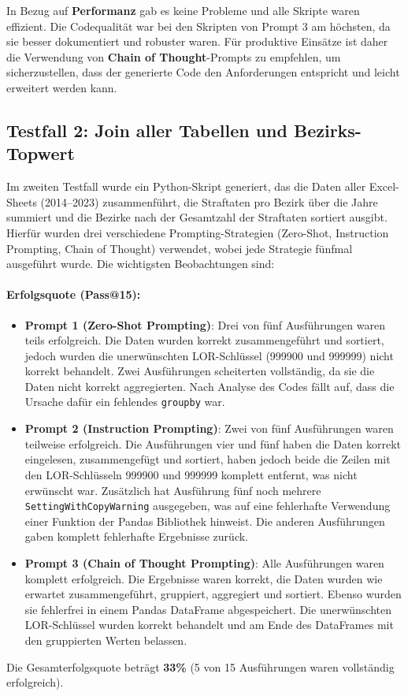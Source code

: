 \documentclass[11pt,a4paper]{article}
\begin{document}
In Bezug auf \textbf{Performanz} gab es keine Probleme und alle Skripte waren effizient. Die Codequalität war bei den Skripten von Prompt 3 am höchsten, da sie besser dokumentiert und robuster waren. Für produktive Einsätze ist daher die Verwendung von \textbf{Chain of Thought}-Prompts zu empfehlen, um sicherzustellen, dass der generierte Code den Anforderungen entspricht und leicht erweitert werden kann.

\subsection{Testfall 2: Join aller Tabellen und Bezirks-Topwert}
\label{subsec:auswertung_testfall2}
Im zweiten Testfall wurde ein Python-Skript generiert, das die Daten aller Excel-Sheets (2014--2023) zusammenführt, die Straftaten pro Bezirk über die Jahre summiert und die Bezirke nach der Gesamtzahl der Straftaten sortiert ausgibt. Hierfür wurden drei verschiedene Prompting-Strategien (Zero-Shot, Instruction Prompting, Chain of Thought) verwendet, wobei jede Strategie fünfmal ausgeführt wurde. Die wichtigsten Beobachtungen sind:

\paragraph{Erfolgsquote (Pass@15):}
\begin{itemize}
    \item \textbf{Prompt 1 (Zero-Shot Prompting)}: Drei von fünf Ausführungen waren teils erfolgreich. Die Daten wurden korrekt zusammengeführt und sortiert, jedoch wurden die unerwünschten LOR-Schlüssel (999900 und 999999) nicht korrekt behandelt. Zwei Ausführungen scheiterten vollständig, da sie die Daten nicht korrekt aggregierten. Nach Analyse des Codes fällt auf, dass die Ursache dafür ein fehlendes \texttt{groupby} war.
    \item \textbf{Prompt 2 (Instruction Prompting)}: Zwei von fünf Ausführungen waren teilweise erfolgreich. Die Ausführungen vier und fünf haben die Daten korrekt eingelesen, zusammengefügt und sortiert, haben jedoch beide die Zeilen mit den LOR-Schlüsseln 999900 und 999999 komplett entfernt, was nicht erwünscht war. Zusätzlich hat Ausführung fünf noch mehrere \texttt{SettingWithCopyWarning} ausgegeben, was auf eine fehlerhafte Verwendung einer Funktion der Pandas Bibliothek hinweist. Die anderen Ausführungen gaben komplett fehlerhafte Ergebnisse zurück.
    \item \textbf{Prompt 3 (Chain of Thought Prompting)}: Alle Ausführungen waren komplett erfolgreich. Die Ergebnisse waren korrekt, die Daten wurden wie erwartet zusammengeführt, gruppiert, aggregiert und sortiert. Ebenso wurden sie fehlerfrei in einem Pandas DataFrame abgespeichert. Die unerwünschten LOR-Schlüssel wurden korrekt behandelt und am Ende des DataFrames mit den gruppierten Werten belassen.
\end{itemize}
Die Gesamterfolgsquote beträgt \textbf{33\%} (5 von 15 Ausführungen waren vollständig erfolgreich).
\end{document}
